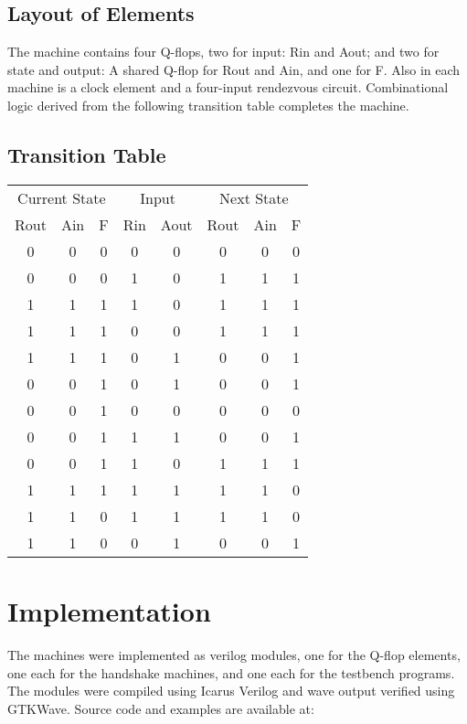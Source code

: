\documentclass[10pt]{article}
\begin{document}
\subsection{Layout of Elements}

The machine contains four Q-flops, two for input: Rin and Aout; and two for state and output: A shared Q-flop for Rout and Ain, and one for F. Also in each machine is a clock element and a four-input rendezvous circuit. Combinational logic derived from the following transition table completes the machine.

\subsection{Transition Table}
\begin{tabular}{ c c c | c c | c c c }
\multicolumn{3}{c|}{Current State} & \multicolumn{2}{c|}{Input} & \multicolumn{3}{c}{Next State} \\
Rout & Ain & F & Rin & Aout & Rout & Ain & F \\ \hline
0 & 0 & 0 & 0 & 0 & 0 & 0 & 0 \\ 
0 & 0 & 0 & 1 & 0 & 1 & 1 & 1 \\ 
1 & 1 & 1 & 1 & 0 & 1 & 1 & 1 \\ 
1 & 1 & 1 & 0 & 0 & 1 & 1 & 1 \\ 
1 & 1 & 1 & 0 & 1 & 0 & 0 & 1 \\ 
0 & 0 & 1 & 0 & 1 & 0 & 0 & 1 \\ 
0 & 0 & 1 & 0 & 0 & 0 & 0 & 0 \\ 
0 & 0 & 1 & 1 & 1 & 0 & 0 & 1 \\ 
0 & 0 & 1 & 1 & 0 & 1 & 1 & 1 \\ 
1 & 1 & 1 & 1 & 1 & 1 & 1 & 0 \\ 
1 & 1 & 0 & 1 & 1 & 1 & 1 & 0 \\ 
1 & 1 & 0 & 0 & 1 & 0 & 0 & 1 \\
\end{tabular}

\section{Implementation}

The machines were implemented as verilog modules, one for the Q-flop elements, one each for the handshake machines, and one each for the testbench programs. The modules were compiled using Icarus Verilog and wave output verified using GTKWave. Source code and examples are available at:
\end{document}
